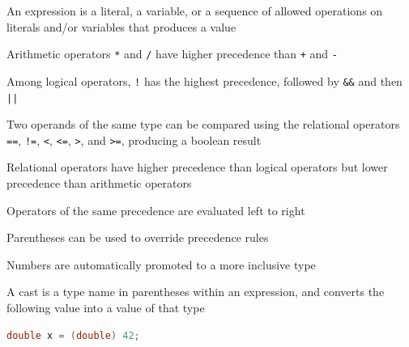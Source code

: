 \documentclass[8pt,a4paper,compress]{beamer}
\begin{document}
\begin{frame}[fragile]
\pause

An expression is a literal, a variable, or a sequence of allowed operations on literals and/or variables that produces a value

\pause\bigskip

Arithmetic operators \lstinline{*} and \lstinline{/} have higher precedence than \lstinline{+} and \lstinline{-}

\pause\bigskip

Among logical operators, \lstinline{!} has the highest precedence, followed by \lstinline{&&} and then \lstinline{||}

\pause\bigskip

Two operands of the same type can be compared using the relational operators \lstinline{==}, \lstinline{!=}, \lstinline{<}, \lstinline{<=}, \lstinline{>}, and \lstinline{>=}, producing a boolean result

\pause\bigskip

Relational operators have higher precedence than logical operators but lower precedence than arithmetic operators

\pause\bigskip

Operators of the same precedence are evaluated left to right

\pause\bigskip

Parentheses can be used to override precedence rules

\pause\bigskip

Numbers are automatically promoted to a more inclusive type

\pause\bigskip

A cast is a type name in parentheses within an expression, and converts the following value into a value of that type

\smallskip

\begin{lstlisting}[language=Java,style=focusin]
double x = (double) 42;
\end{lstlisting}
\end{frame}
\end{document}
